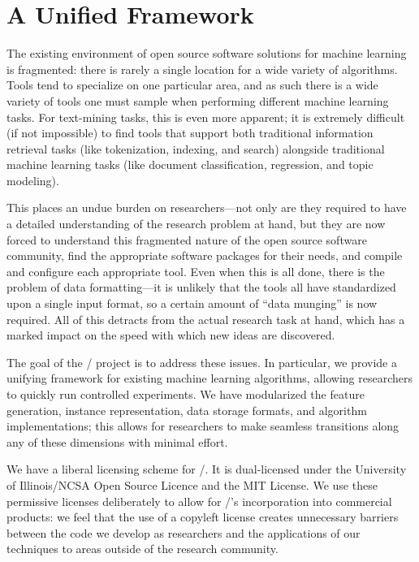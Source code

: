 \section{A Unified Framework}

The existing environment of open source software solutions for machine learning
is fragmented: there is rarely a single location for a wide variety of
algorithms. Tools tend to specialize on one particular area, and as such there
is a wide variety of tools one must sample when performing different machine
learning tasks. For text-mining tasks, this is even more apparent; it is
extremely difficult (if not impossible) to find tools that support both
traditional information retrieval tasks (like tokenization, indexing, and
search) alongside traditional machine learning tasks (like document
classification, regression, and topic modeling).

This places an undue burden on researchers---not only are they required to have
a detailed understanding of the research problem at hand, but they are now
forced to understand this fragmented nature of the open source software
community, find the appropriate software packages for their needs, and compile
and configure each appropriate tool. Even when this is all done, there is the
problem of data formatting---it is unlikely that the tools all have standardized
upon a single input format, so a certain amount of ``data munging'' is now
required. All of this detracts from the actual research task at hand, which has
a marked impact on the speed with which new ideas are discovered.

The goal of the \meta/ project is to address these issues. In particular,
we provide a unifying framework for existing machine learning algorithms,
allowing researchers to quickly run controlled experiments. We have modularized
the feature generation, instance representation, data storage formats, and
algorithm implementations; this allows for researchers to make seamless
transitions along any of these dimensions with minimal effort.

We have a liberal licensing scheme for \meta/. It is dual-licensed under
the University of Illinois/NCSA Open Source Licence and the MIT License. We use
these permissive licenses deliberately to allow for \meta/'s
incorporation into commercial products: we feel that the use of a copyleft
license creates unnecessary barriers between the code we develop as researchers
and the applications of our techniques to areas outside of the research
community.

